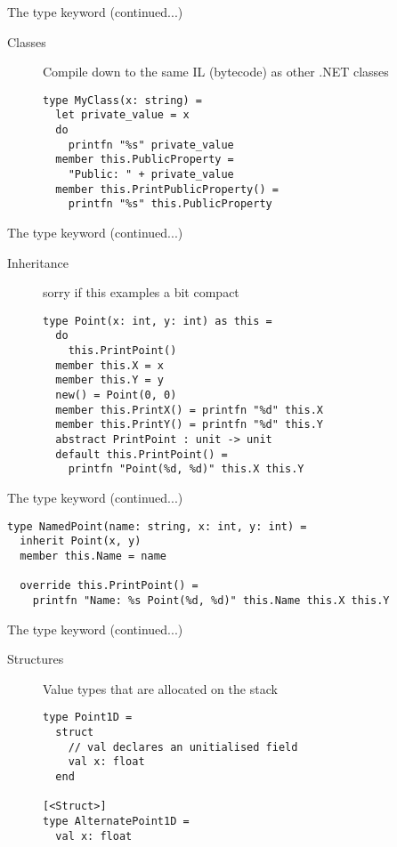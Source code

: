 \documentclass[landscape]{slides}
\begin{document}
\begin{slide}{The type keyword (continued...)}
\begin{description}
\item[Classes] Compile down to the same IL (bytecode) as other .NET classes
\begin{verbatim}
type MyClass(x: string) =        
  let private_value = x
  do
    printfn "%s" private_value
  member this.PublicProperty = 
    "Public: " + private_value
  member this.PrintPublicProperty() =
    printfn "%s" this.PublicProperty
\end{verbatim}
\end{description}
\end{slide}

\begin{slide}{The type keyword (continued...)}
\begin{description}
\item[Inheritance] sorry if this examples a bit compact 
\begin{verbatim}
type Point(x: int, y: int) as this =
  do
    this.PrintPoint()
  member this.X = x
  member this.Y = y
  new() = Point(0, 0)
  member this.PrintX() = printfn "%d" this.X
  member this.PrintY() = printfn "%d" this.Y
  abstract PrintPoint : unit -> unit
  default this.PrintPoint() = 
    printfn "Point(%d, %d)" this.X this.Y
\end{verbatim}
\end{description}
\end{slide}

\begin{slide}{The type keyword (continued...)}
\begin{description}
\begin{verbatim}
type NamedPoint(name: string, x: int, y: int) =
  inherit Point(x, y)
  member this.Name = name

  override this.PrintPoint() =
    printfn "Name: %s Point(%d, %d)" this.Name this.X this.Y
\end{verbatim}
\end{description}
\end{slide}

\begin{slide}{The type keyword (continued...)}
\begin{description}
\item[Structures] Value types that are allocated on the stack 
\begin{verbatim}
type Point1D =
  struct 
    // val declares an unitialised field 
    val x: float
  end

[<Struct>]
type AlternatePoint1D = 
  val x: float
\end{verbatim}
\end{description}
\end{slide}
\end{document}
